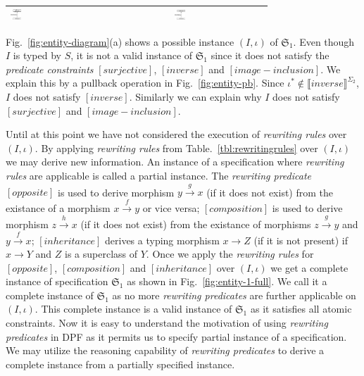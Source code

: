 \documentclass{eceasst}
\begin{document}
\begin{table}[h]
\begin{center}
\begin{tabular}{| l | c | c | c | c | }
				    \includegraphics[width=0.10\textwidth]{inheritance2-L-delta.pdf} & \includegraphics[width=0.10\textwidth]{inheritance2-R-delta.pdf} \\ 				    
    \hline    
    \end{tabular}
    \end{center}
\end{table}
\normalsize



Fig.~\ref{fig:entity-diagram}(a) shows a possible instance $(I, \iota)$ of $\mathfrak{S}_1$. 
Even though $I$ is typed by $S$, it is not a valid instance of $\mathfrak{S}_1$ since it does not satisfy the \textit{predicate constraints} $[surjective]$, $[inverse]$ and $[image-inclusion]$. 
We explain this by a pullback operation in Fig.~\ref{fig:entity-pb}. Since $\iota^* \notin \llbracket inverse \rrbracket^{\Sigma_2}$, $I$ does not satisfy $[inverse]$. 
Similarly we can explain why $I$ does not satisfy $[surjective]$ and $[image-inclusion]$. 



 
Until at this point we have not considered the execution of \textit{rewriting rules} over $(I, \iota)$. 
By applying \textit{rewriting rules} from Table.~\ref{tbl:rewritingrules} over $(I, \iota)$ we may derive new information. 
An instance of a specification where \textit{rewriting rules} are applicable is called a partial instance. 
The \textit{rewriting predicate} $[opposite]$ is used to derive morphism $y \xrightarrow{g} x$ (if it does not exist) from the existance of a morphism $x \xrightarrow{f} y$ or vice versa; 
$[composition]$ is used to derive morphism $z \xrightarrow{h} x$ (if it does not exist) from the existance of morphisms $z \xrightarrow{g} y$ and $y \xrightarrow{f} x$; 
$[inheritance]$ derives a typing morphism $x \rightarrow Z$ (if it is not present) if $x \rightarrow Y$ and $Z$ is a superclass of $Y$. 
Once we apply the \textit{rewriting rules} for $[opposite]$, $[composition]$ and $[inheritance]$ over $(I, \iota)$ we get a complete instance of specification $\mathfrak{S}_1$ as shown in 
Fig.~\ref{fig:entity-1-full}. We call it a complete instance of $\mathfrak{S}_1$ as no more \textit{rewriting predicates} are further applicable on $(I, \iota)$. 
This complete instance is a valid instance of $\mathfrak{S}_1$ as it satisfies all atomic constraints. 
Now it is easy to understand the motivation of using \textit{rewriting predicates} in DPF as it permits us to specify partial instance of a specification. 
We may utilize the reasoning capability of \textit{rewriting predicates} to derive a complete instance from a partially specified instance. 
\end{document}
